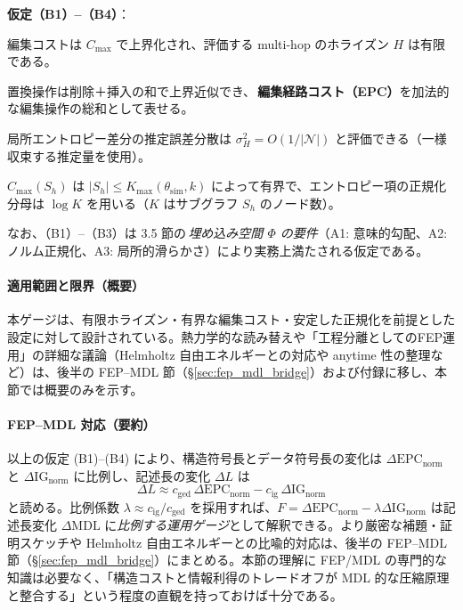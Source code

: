 \documentclass[ja=standard,xelatex]{bxjsarticle}
\newcommand{\gednorm}{\Delta\mathrm{EPC}_{\mathrm{norm}}}
\newcommand{\ignorm}{\Delta\mathrm{IG}_{\mathrm{norm}}}
\begin{document}
\noindent \textbf{仮定（B1）–（B4）}：
\begin{description}[leftmargin=1.8em]
  \item[(B1) 局所有界性] 編集コストは $C_{\max}$ で上界化され、評価する multi-hop のホライズン $H$ は有限である。
  \item[(B2) 編集分解] 置換操作は削除＋挿入の和で上界近似でき、\,\textbf{編集経路コスト（EPC）}を加法的な編集操作の総和として表せる。
  \item[(B3) エントロピー推定] 局所エントロピー差分の推定誤差分散は $\sigma_H^2=O(1/|\mathcal{N}|)$ と評価できる（一様収束する推定量を使用）。
  \item[(B4) 正規化安定性] $C_{\max}(S_h)$ は $|S_h| \le K_{\max}(\theta_{\mathrm{sim}},k)$ によって有界で、エントロピー項の正規化分母は $\log K$ を用いる（$K$ はサブグラフ $S_h$ のノード数）。
\end{description}
\noindent なお、（B1）–（B3）は 3.5 節の\,\emph{埋め込み空間 $\Phi$ の要件}（A1: 意味的勾配、A2: ノルム正規化、A3: 局所的滑らかさ）により実務上満たされる仮定である。



\paragraph{適用範囲と限界（概要）}\label{sec:fep_mdl_bridge_applicability}
本ゲージは、有限ホライズン・有界な編集コスト・安定した正規化を前提とした設定に対して設計されている。熱力学的な読み替えや「工程分離としてのFEP運用」の詳細な議論（Helmholtz 自由エネルギーとの対応や anytime 性の整理など）は、後半の FEP--MDL 節（\S\ref{sec:fep_mdl_bridge}）および付録に移し、本節では概要のみを示す。

\paragraph{FEP--MDL 対応（要約）}
以上の仮定 (B1)--(B4) により、構造符号長とデータ符号長の変化は $\gednorm$ と $\ignorm$ に比例し、記述長の変化 $\Delta L$ は
\[
  \Delta L \approx c_{\mathrm{ged}}\,\gednorm - c_{\mathrm{ig}}\,\ignorm
\]
と読める。比例係数 $\lambda\approx c_{\mathrm{ig}}/c_{\mathrm{ged}}$ を採用すれば、$F=\gednorm-\lambda\ignorm$ は記述長変化 $\Delta\mathrm{MDL}$ に\emph{比例する運用ゲージ}として解釈できる。より厳密な補題・証明スケッチや Helmholtz 自由エネルギーとの比喩的対応は、後半の FEP--MDL 節（\S\ref{sec:fep_mdl_bridge}）にまとめる。本節の理解に FEP/MDL の専門的な知識は必要なく、「構造コストと情報利得のトレードオフが MDL 的な圧縮原理と整合する」という程度の直観を持っておけば十分である。
\end{document}
